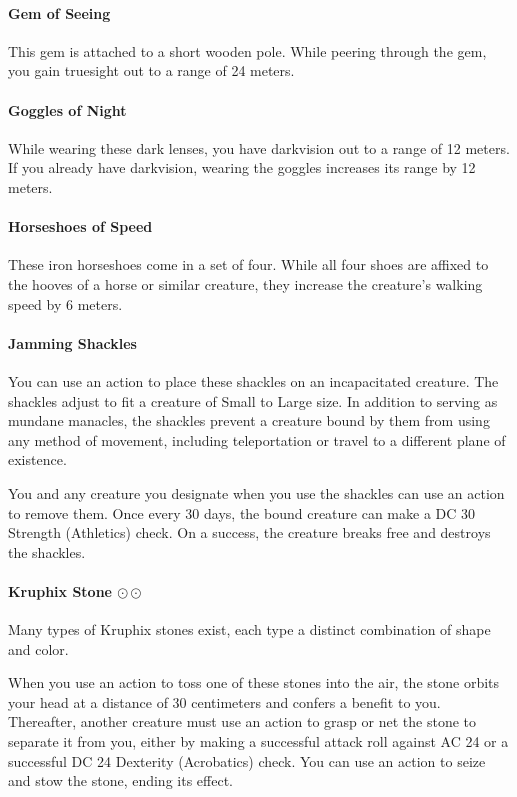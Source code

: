     \paragraph{Gem of Seeing}
        This gem is attached to a short wooden pole.
        While peering through the gem, you gain truesight out to a range of 24 meters.
    \paragraph{Goggles of Night}
        While wearing these dark lenses, you have darkvision out to a range of 12 meters.
        If you already have darkvision, wearing the goggles increases its range by 12 meters.
    \paragraph{Horseshoes of Speed}
        These iron horseshoes come in a set of four.
        While all four shoes are affixed to the hooves of a horse or similar creature, they increase the creature's walking speed by 6 meters.
    \paragraph{Jamming Shackles}
        You can use an action to place these shackles on an incapacitated creature.
        The shackles adjust to fit a creature of Small to Large size.
        In addition to serving as mundane manacles, the shackles prevent a creature bound by them from using any method of movement, including teleportation or travel to a different plane of existence.

        You and any creature you designate when you use the shackles can use an action to remove them.
        Once every 30 days, the bound creature can make a DC 30 Strength (Athletics) check.
        On a success, the creature breaks free and destroys the shackles.
    \paragraph{Kruphix Stone $\odot\odot$} \label{item::kruphixstone}
        Many types of Kruphix stones exist, each type a distinct combination of shape and color.

        When you use an action to toss one of these stones into the air, the stone orbits your head at a distance of 30 centimeters and confers a benefit to you.
        Thereafter, another creature must use an action to grasp or net the stone to separate it from you, either by making a successful attack roll against AC 24 or a successful DC 24 Dexterity (Acrobatics) check.
        You can use an action to seize and stow the stone, ending its effect.

